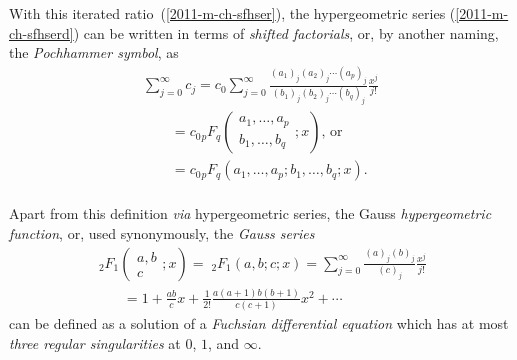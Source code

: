 With this iterated ratio~(\ref{2011-m-ch-sfhser}),
the hypergeometric series (\ref{2011-m-ch-sfhserd}) can be written in terms of
{\em shifted factorials},
or, by another naming,
the
{\em Pochhammer symbol},
as
\begin{equation}
\begin{split}
\sum_{j=0}^\infty c_j
=
 c_0 \sum_{j=0}^\infty  \frac{( a_1)_j( a_2)_j\cdots ( a_p)_j}{( b_1)_j( b_2)_j\cdots ( b_q)_j}
\frac{x^j}{j!}
\\
\qquad =
c_0 {{}_pF_q} \left(
\begin{array}{cc}
a_1,\ldots ,a_p\\
b_1,\ldots ,b_q
\end{array} ; x
\right)     \textrm{, or }\\
\qquad =
c_0 {{}_pF_q} \left(
a_1,\ldots ,a_p;
b_1,\ldots ,b_q
 ; x
\right) .     \\
\end{split}
\label{2011-m-ch-sfhserd1}
\end{equation}

Apart from this definition {\it via}
hypergeometric series, the Gauss {\em hypergeometric function},
or, used synonymously,
the {\em Gauss series}
\begin{equation}
\begin{split}
{\;}_2F_1 \left(
\begin{array}{cc}
a ,b\\
c
\end{array} ; x
\right)
={\;}_2F_1 \left(
a ,b;c ; x
\right)
=   \sum_{j=0}^\infty  \frac{( a)_j( b)_j}{(c)_j} \frac{x^j}{j!}
\\
\qquad
=
1+ \frac{ab}{c} x   + \frac{1}{2!}\frac{a(a+1)b(b+1)}{c(c+1)} x^2
+ \cdots
\end{split}
\end{equation}
can be defined as a solution of a {\em Fuchsian differential equation}
which has at most {\em three regular singularities}
at $0$, $1$, and $\infty$.

